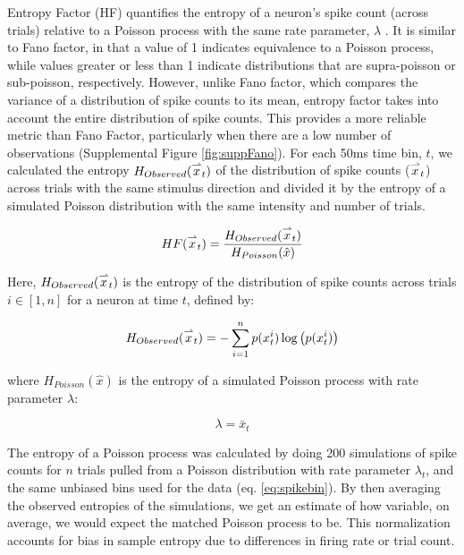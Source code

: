 Entropy Factor (HF) quantifies the entropy of a neuron's spike count (across trials) relative to a Poisson process with the same rate parameter, $\lambda$ \parencite{Rajdl2017}. It is similar to Fano factor, in that a value of 1 indicates equivalence to a Poisson process, while values greater or less than 1 indicate distributions that are supra-poisson or sub-poisson, respectively. However, unlike Fano factor, which compares the variance of a distribution of spike counts to its mean, entropy factor takes into account the entire distribution of spike counts. This provides a more reliable metric than Fano Factor, particularly when there are a low number of observations (Supplemental Figure \ref{fig:suppFano}). For each 50ms time bin, $t$, we calculated the entropy $H_{Observed}(\overset{\rightharpoonup} x_t)$ of the distribution of spike counts ($\overset{\rightharpoonup} x_t$) across trials with the same stimulus direction and divided it by the entropy of a simulated Poisson distribution with the same intensity and number of trials.

\begin{equation}
	HF(\overset{\rightharpoonup} x_t) = \frac{H_{Observed}(\overset{\rightharpoonup} x_t)}{H_{Poisson}( \hat{x})}
\end{equation}

Here, $H_{Observed}(\overset{\rightharpoonup} x_t)$ is the entropy of the distribution of spike counts across trials $i \in [1,n]$ for a neuron at time $t$, defined by:

\begin{equation}
	H_{Observed}(\overset{\rightharpoonup} x_t) = - \sum_{i=1}^n{p(x_t^i) \log\left(p(x_t^i)\right)}
\end{equation}

\noindent where $H_{Poisson}(\hat{x})$ is the entropy of a simulated Poisson process with rate parameter $\lambda$:

\begin{equation}
	\lambda = \bar{x}_t
\end{equation}

The entropy of a Poisson process was calculated by doing 200 simulations of spike counts for $n$ trials pulled from a Poisson distribution with rate parameter $\lambda _t$, and the same unbiased bins used for the data (eq. \ref{eq:spikebin}). By then averaging the observed entropies of the simulations, we get an estimate of how variable, on average, we would expect the matched Poisson process to be. This normalization accounts for bias in sample entropy due to differences in firing rate or trial count. 

